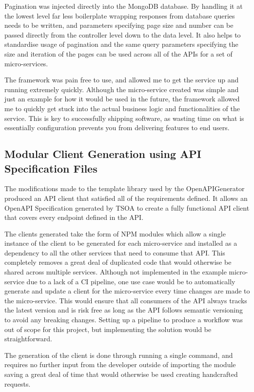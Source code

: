 Pagination was injected directly into the MongoDB database. By handling it at the lowest level far less boilerplate wrapping responses from database queries needs to be written, and parameters specifying page size and number can be passed directly from the controller level down to the data level. It also helps to standardise usage of pagination and the same query parameters specifying the size and iteration of the pages can be used across all of the APIs for a set of micro-services.

The framework was pain free to use, and allowed me to get the service up and running extremely quickly. Although the micro-service created was simple and just an example for how it would be used in the future, the framework allowed me to quickly get stuck into the actual business logic and functionalities of the service. This is key to successfully shipping software, as wasting time on what is essentially configuration prevents you from delivering features to end users.
\subsection{Modular Client Generation using API Specification Files}
The modifications made to the template library used by the OpenAPIGenerator produced an API client that satisfied all of the requirements defined. It allows an OpenAPI Specification generated by TSOA to create a fully functional API client that covers every endpoint defined in the API. 

The clients generated take the form of NPM modules which allow a single instance of the client to be generated for each micro-service and installed as a dependency to all the other services that need to consume that API. This completely removes a great deal of duplicated code that would otherwise be shared across multiple services. Although not implemented in the example micro-service due to a lack of a CI pipeline, one use case would be to automatically generate and update a client for the micro-service every time changes are made to the micro-service. This would ensure that all consumers of the API always tracks the latest version and is risk free as long as the API follows semantic versioning to avoid any breaking changes. Setting up a pipeline to produce a workflow was out of scope for this project, but implementing the solution would be straightforward.

The generation of the client is done through running a single command, and requires no further input from the developer outside of importing the module saving a great deal of time that would otherwise be used creating handcrafted requests.

